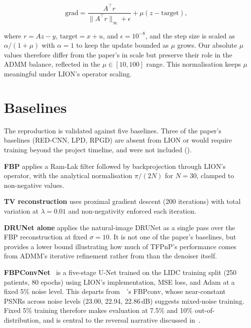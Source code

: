 \begin{equation}
\text{grad} = \frac{A^{\top}r}{\|A^{\top}r\|_\infty + \epsilon} +
              \mu(z - \text{target}),
\end{equation}

where $r = Az - y$, $\text{target} = x + u$, and $\epsilon = 10^{-8}$, and the step size is scaled as $\alpha / (1 + \mu)$ with $\alpha = 1$ to keep the update bounded as $\mu$ grows. Our absolute $\mu$ values therefore differ from the paper's in scale but preserve their role in the ADMM balance, reflected in the $\mu \in [10, 100]$ range. This normalisation keeps $\mu$ meaningful under LION's operator scaling.

\section{Baselines}
\label{sec:baselines}

The reproduction is validated against five baselines. Three of the paper's baselines (RED-CNN, LPD, RPGD) are absent from LION or would require training beyond the project timeline, and were not included ().

\textbf{FBP} applies a Ram-Lak filter followed by backprojection through LION's operator, with the analytical normalisation $\pi / (2N)$ for $N = 30$, clamped to non-negative values.

\textbf{TV reconstruction} uses proximal gradient descent (200 iterations) with total variation at $\lambda = 0.01$ and non-negativity enforced each iteration.

\textbf{DRUNet alone} applies the natural-image DRUNet as a single pass over the FBP reconstruction at fixed $\sigma = 10$. It is not one of the paper's baselines, but provides a lower bound illustrating how much of TFPnP's performance comes from ADMM's iterative refinement rather from than the denoiser itself.

\textbf{FBPConvNet}~\citep{Jin2017FBPConvNet} is a five-stage U-Net trained on the LIDC training split (250 patients, 80 epochs) using LION's implementation, MSE loss, and Adam at a fixed 5\% noise level. This departs from~~\citet{Wei2022TFPnP}'s FBPconv, whose near-constant PSNRs across noise levels (23.00, 22.94, 22.86\,dB) suggests mixed-noise training. Fixed 5\% training therefore makes evaluation at 7.5\% and 10\% out-of-distribution, and is central to the reversal narrative discussed in~.

